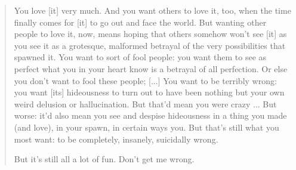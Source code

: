 \begin{quotation}
You love [it] very much. And you want others to love it, too, when the time
finally comes for [it] to go out and face the world. But wanting other people
to love it, now, means hoping that others somehow won't see [it] as you see it
\dash as a grotesque, malformed betrayal of the very possibilities that
spawned it. You want to sort of fool people: you want them to see as perfect
what you in your heart know is a betrayal of all perfection. Or else you don't
want to fool these people; [...] You want to be terribly wrong: you want [its]
hideousness to turn out to have been nothing but your own weird delusion or
hallucination. But that'd mean you were crazy ... But worse: it'd also mean
you see and despise hideousness in a thing you made (and love), in your spawn,
in certain ways you. But that's still what you most want: to be completely,
insanely, suicidally wrong.

But it's still all a lot of fun. Don't get me wrong.
\end{quotation}
